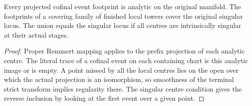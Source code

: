 \begin{proposition}
\label{hir:g8-analytic-event-footprints}
\leanok
Every projected cofinal event footprint is analytic on the
original manifold. The footprints of a covering family of finished
local towers cover the original singular locus. The union equals
the singular locus if all centres are intrinsically singular at
their actual stages.
\end{proposition}
\begin{proof}
Proper Remmert mapping applies to the prefix projection of
each analytic centre. The literal trace of a cofinal event on
each containing chart is this analytic image or is empty.
A point missed by all the local centres lies on the open over
which the actual projection is an isomorphism, so smoothness
of the terminal strict transform implies regularity there.
The singular centre condition gives the reverse inclusion by
looking at the first event over a given point.
\end{proof}

